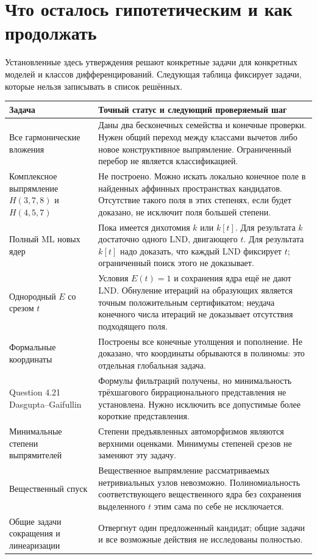 \section{Что осталось гипотетическим и как продолжать}

Установленные здесь утверждения решают конкретные задачи для конкретных
моделей и классов дифференцирований. Следующая таблица фиксирует задачи,
которые нельзя записывать в список решённых.

\begin{longtable}{L{0.30\textwidth}L{0.64\textwidth}}
\toprule Задача & Точный статус и следующий проверяемый шаг \\ \midrule
\endhead
Все гармонические вложения & Даны два бесконечных семейства и конечные
проверки. Нужен общий переход между классами вычетов либо новое
конструктивное выпрямление. Ограниченный перебор не является классификацией.\\[6pt]
Комплексное выпрямление $H(3,7,8)$ и $H(4,5,7)$ & Не построено.
Можно искать локально конечное поле в найденных аффинных пространствах
кандидатов. Отсутствие такого поля в этих степенях, если будет доказано,
не исключит поля большей степени.\\[6pt]
Полный ML новых ядер & Пока имеется дихотомия $k$ или $k[t]$.
Для результата $k$ достаточно одного LND, двигающего $t$.
Для результата $k[t]$ надо доказать, что каждый LND фиксирует $t$;
ограниченный поиск этого не доказывает.\\[6pt]
Однородный $E$ со срезом $t$ & Условия $E(t)=1$ и сохранения ядра
ещё не дают LND. Обнуление итераций на образующих является точным
положительным сертификатом; неудача конечного числа итераций не
доказывает отсутствия подходящего поля.\\[6pt]
Формальные координаты & Построены все конечные утолщения и пополнение.
Не доказано, что координаты обрываются в полиномы: это отдельная
глобальная задача.\\[6pt]
Question 4.21 Dasgupta--Gaifullin & Формулы фильтраций получены,
но минимальность трёхшагового биррационального представления не
установлена. Нужно исключить все допустимые более короткие представления.\\[6pt]
Минимальные степени выпрямителей & Степени предъявленных автоморфизмов
являются верхними оценками. Минимумы степеней срезов не заменяют эту задачу.\\[6pt]
Вещественный спуск & Вещественное выпрямление рассматриваемых нетривиальных
узлов невозможно. Полиномиальность соответствующего вещественного
ядра без сохранения выделенного $t$ этим сама по себе не исключается.\\[6pt]
Общие задачи сокращения и линеаризации & Отвергнут один предложенный
кандидат; общие задачи и все возможные действия не исследованы полностью.\\
\bottomrule
\end{longtable}

